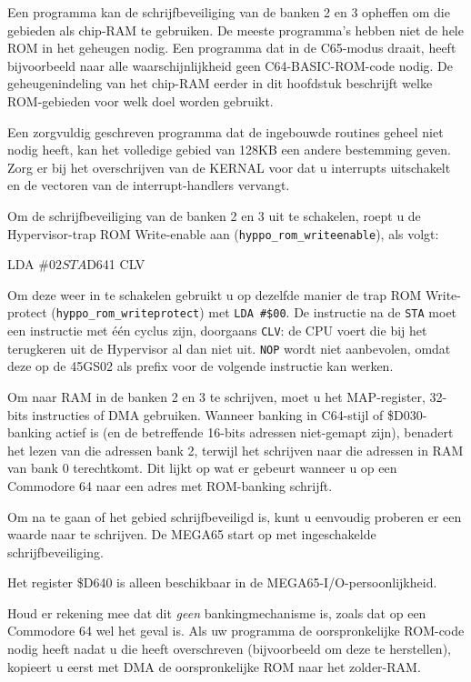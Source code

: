 Een programma kan de schrijfbeveiliging van de banken 2 en 3 opheffen om die gebieden als chip-RAM te gebruiken. De meeste programma's hebben niet de hele ROM in het geheugen nodig. Een programma dat in de C65-modus draait, heeft bijvoorbeeld naar alle waarschijnlijkheid geen C64-BASIC-ROM-code nodig. De geheugenindeling van het chip-RAM eerder in dit hoofdstuk beschrijft welke ROM-gebieden voor welk doel worden gebruikt.

Een zorgvuldig geschreven programma dat de ingebouwde routines geheel niet nodig heeft, kan het volledige gebied van 128KB een andere bestemming geven. Zorg er bij het overschrijven van de KERNAL voor dat u interrupts uitschakelt en de vectoren van de interrupt-handlers vervangt.

Om de schrijfbeveiliging van de banken 2 en 3 uit te schakelen, roept u de Hypervisor-trap ROM Write-enable aan ({\tt hyppo\_rom\_writeenable}), als volgt:

\begin{asmcodesmall}
LDA #$02
STA $D641
CLV
\end{asmcodesmall}

Om deze weer in te schakelen gebruikt u op dezelfde manier de trap ROM Write-protect ({\tt hyppo\_rom\_writeprotect}) met {\tt LDA \#\$00}. De instructie na de {\tt STA} moet een instructie met één cyclus zijn, doorgaans {\tt CLV}: de CPU voert die bij het terugkeren uit de Hypervisor al dan niet uit. {\tt NOP} wordt niet aanbevolen, omdat deze op de 45GS02 als prefix voor de volgende instructie kan werken.

Om naar RAM in de banken 2 en 3 te schrijven, moet u het MAP-register, 32-bits instructies of DMA gebruiken. Wanneer banking in C64-stijl of \$D030-banking actief is (en de betreffende 16-bits adressen niet-gemapt zijn), benadert het lezen van die adressen bank 2, terwijl het schrijven naar die adressen in RAM van bank 0 terechtkomt. Dit lijkt op wat er gebeurt wanneer u op een Commodore 64 naar een adres met ROM-banking schrijft.

Om na te gaan of het gebied schrijfbeveiligd is, kunt u eenvoudig proberen er een waarde naar te schrijven. De MEGA65 start op met ingeschakelde schrijfbeveiliging.

Het register \$D640 is alleen beschikbaar in de MEGA65-I/O-persoonlijkheid.

Houd er rekening mee dat dit {\em geen} bankingmechanisme is, zoals dat op een Commodore 64 wel het geval is. Als uw programma de oorspronkelijke ROM-code nodig heeft nadat u die heeft overschreven (bijvoorbeeld om deze te herstellen), kopieert u eerst met DMA de oorspronkelijke ROM naar het zolder-RAM.

